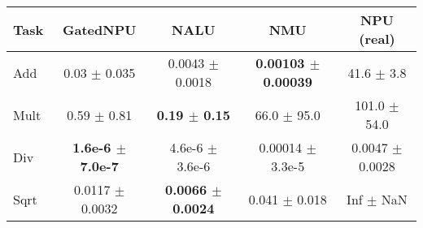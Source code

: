 \begin{tabular}{lcccc}
\toprule
Task & GatedNPU & NALU & NMU & NPU (real)\\
\midrule
Add  & 0.03 $\pm$ 0.035 & 0.0043 $\pm$ 0.0018 & \textbf{0.00103 $\pm$ 0.00039} & 41.6 $\pm$ 3.8 \\
Mult & 0.59 $\pm$ 0.81 & \textbf{0.19 $\pm$ 0.15} & 66.0 $\pm$ 95.0 & 101.0 $\pm$ 54.0 \\
Div  & \textbf{1.6e-6 $\pm$ 7.0e-7} & 4.6e-6 $\pm$ 3.6e-6 & 0.00014 $\pm$ 3.3e-5 & 0.0047 $\pm$ 0.0028 \\
Sqrt & 0.0117 $\pm$ 0.0032 & \textbf{0.0066 $\pm$ 0.0024} & 0.041 $\pm$ 0.018 & Inf $\pm$ NaN \\
\bottomrule
\end{tabular}
